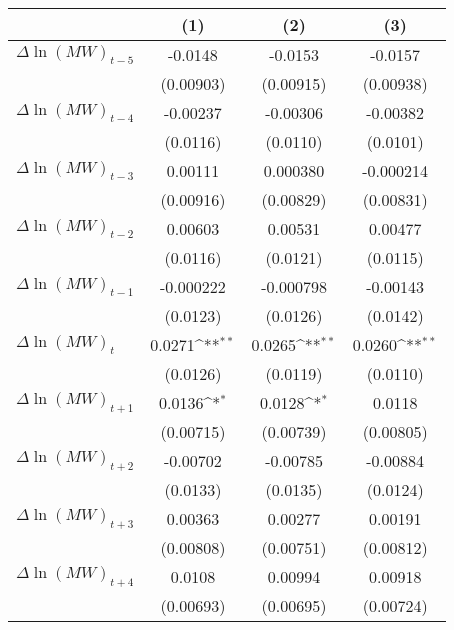 {
\def\sym#1{\ifmmode^{#1}\else\(^{#1}\)\fi}
\begin{tabular}{l*{3}{c}}
\hline\hline
          &\multicolumn{1}{c}{(1)}         &\multicolumn{1}{c}{(2)}         &\multicolumn{1}{c}{(3)}         \\
\hline
$\Delta \ln(MW)_{t-5}$&  -0.0148         &  -0.0153         &  -0.0157         \\
          &(0.00903)         &(0.00915)         &(0.00938)         \\
[1em]
$\Delta \ln(MW)_{t-4}$& -0.00237         & -0.00306         & -0.00382         \\
          & (0.0116)         & (0.0110)         & (0.0101)         \\
[1em]
$\Delta \ln(MW)_{t-3}$&  0.00111         & 0.000380         &-0.000214         \\
          &(0.00916)         &(0.00829)         &(0.00831)         \\
[1em]
$\Delta \ln(MW)_{t-2}$&  0.00603         &  0.00531         &  0.00477         \\
          & (0.0116)         & (0.0121)         & (0.0115)         \\
[1em]
$\Delta \ln(MW)_{t-1}$&-0.000222         &-0.000798         & -0.00143         \\
          & (0.0123)         & (0.0126)         & (0.0142)         \\
[1em]
$\Delta \ln(MW)_{t}$&   0.0271\sym{**} &   0.0265\sym{**} &   0.0260\sym{**} \\
          & (0.0126)         & (0.0119)         & (0.0110)         \\
[1em]
$\Delta \ln(MW)_{t+1}$&   0.0136\sym{*}  &   0.0128\sym{*}  &   0.0118         \\
          &(0.00715)         &(0.00739)         &(0.00805)         \\
[1em]
$\Delta \ln(MW)_{t+2}$& -0.00702         & -0.00785         & -0.00884         \\
          & (0.0133)         & (0.0135)         & (0.0124)         \\
[1em]
$\Delta \ln(MW)_{t+3}$&  0.00363         &  0.00277         &  0.00191         \\
          &(0.00808)         &(0.00751)         &(0.00812)         \\
[1em]
$\Delta \ln(MW)_{t+4}$&   0.0108         &  0.00994         &  0.00918         \\
          &(0.00693)         &(0.00695)         &(0.00724)         \\

\end{tabular}}
